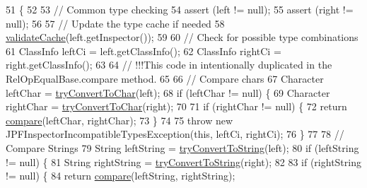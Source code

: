\begin{DoxyCode}
51                                                                                                            
                                        \{
52 
53     \textcolor{comment}{// Common type checking}
54     assert (left != null);
55     assert (right != null);
56 
57     \textcolor{comment}{// Update the type cache if needed}
58     \hyperlink{classgov_1_1nasa_1_1jpf_1_1inspector_1_1server_1_1programstate_1_1relop_1_1_rel_op_comparable_base_a7e8b465bb4002c1759b6096f9e2eecbf}{validateCache}(left.getInspector());
59 
60     \textcolor{comment}{// Check for possible type combinations}
61     ClassInfo leftCi = left.getClassInfo();
62     ClassInfo rightCi = right.getClassInfo();
63 
64     \textcolor{comment}{// !!!This code in intentionally duplicated in the RelOpEqualBase.compare method.}
65 
66     \textcolor{comment}{// Compare chars}
67     Character leftChar = \hyperlink{classgov_1_1nasa_1_1jpf_1_1inspector_1_1server_1_1programstate_1_1relop_1_1_rel_op_comparable_base_a1e3bca3adb8c3a790eaad60d9adf5c47}{tryConvertToChar}(left);
68     \textcolor{keywordflow}{if} (leftChar != null) \{
69       Character rightChar = \hyperlink{classgov_1_1nasa_1_1jpf_1_1inspector_1_1server_1_1programstate_1_1relop_1_1_rel_op_comparable_base_a1e3bca3adb8c3a790eaad60d9adf5c47}{tryConvertToChar}(right);
70 
71       \textcolor{keywordflow}{if} (rightChar != null) \{
72         \textcolor{keywordflow}{return} \hyperlink{classgov_1_1nasa_1_1jpf_1_1inspector_1_1server_1_1programstate_1_1relop_1_1_rel_op_comparable_base_a8b752e9df78b668d5b917c6285225d81}{compare}(leftChar, rightChar);
73       \}
74 
75       \textcolor{keywordflow}{throw} \textcolor{keyword}{new} JPFInspectorIncompatibleTypesException(\textcolor{keyword}{this}, leftCi, rightCi);
76     \}
77 
78     \textcolor{comment}{// Compare Strings}
79     String leftString = \hyperlink{classgov_1_1nasa_1_1jpf_1_1inspector_1_1server_1_1programstate_1_1relop_1_1_rel_op_comparable_base_aa1b564784dad5abf5565f080fe1a3a9f}{tryConvertToString}(left);
80     \textcolor{keywordflow}{if} (leftString != null) \{
81       String rightString = \hyperlink{classgov_1_1nasa_1_1jpf_1_1inspector_1_1server_1_1programstate_1_1relop_1_1_rel_op_comparable_base_aa1b564784dad5abf5565f080fe1a3a9f}{tryConvertToString}(right);
82 
83       \textcolor{keywordflow}{if} (rightString != null) \{
84         \textcolor{keywordflow}{return} \hyperlink{classgov_1_1nasa_1_1jpf_1_1inspector_1_1server_1_1programstate_1_1relop_1_1_rel_op_comparable_base_a8b752e9df78b668d5b917c6285225d81}{compare}(leftString, rightString);

\end{DoxyCode}

